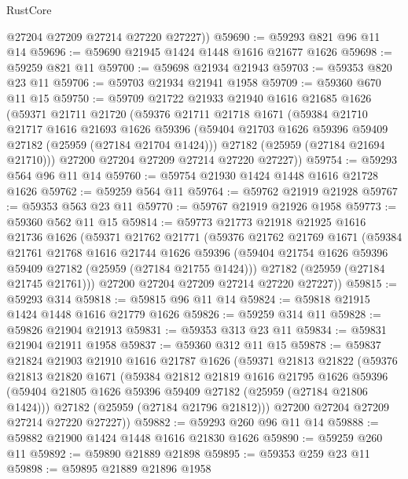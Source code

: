 \begin{lexlean}{RustCore}
\begin{coremodule}
        @27204
        @27209
        @27214
        @27220
        @27227))
@59690 := @59293 @821 @96 @11 @14
@59696 := @59690 @21945 @1424 @1448 @1616 @21677 @1626
@59698 := @59259 @821 @11
@59700 := @59698 @21934 @21943
@59703 := @59353 @820 @23 @11
@59706 := @59703 @21934 @21941 @1958
@59709 := @59360 @670 @11 @15
@59750 := @59709
    @21722
    @21933
    @21940
    @1616
    @21685
    @1626
    (@59371
      @21711
      @21720
      (@59376
        @21711
        @21718
        @1671
        (@59384
          @21710
          @21717
          @1616
          @21693
          @1626
          @59396
          (@59404 @21703 @1626 @59396 @59409 @27182 (@25959 (@27184 @21704 @1424)))
          @27182
          (@25959 (@27184 @21694 @21710)))
        @27200
        @27204
        @27209
        @27214
        @27220
        @27227))
@59754 := @59293 @564 @96 @11 @14
@59760 := @59754 @21930 @1424 @1448 @1616 @21728 @1626
@59762 := @59259 @564 @11
@59764 := @59762 @21919 @21928
@59767 := @59353 @563 @23 @11
@59770 := @59767 @21919 @21926 @1958
@59773 := @59360 @562 @11 @15
@59814 := @59773
    @21773
    @21918
    @21925
    @1616
    @21736
    @1626
    (@59371
      @21762
      @21771
      (@59376
        @21762
        @21769
        @1671
        (@59384
          @21761
          @21768
          @1616
          @21744
          @1626
          @59396
          (@59404 @21754 @1626 @59396 @59409 @27182 (@25959 (@27184 @21755 @1424)))
          @27182
          (@25959 (@27184 @21745 @21761)))
        @27200
        @27204
        @27209
        @27214
        @27220
        @27227))
@59815 := @59293 @314
@59818 := @59815 @96 @11 @14
@59824 := @59818 @21915 @1424 @1448 @1616 @21779 @1626
@59826 := @59259 @314 @11
@59828 := @59826 @21904 @21913
@59831 := @59353 @313 @23 @11
@59834 := @59831 @21904 @21911 @1958
@59837 := @59360 @312 @11 @15
@59878 := @59837
    @21824
    @21903
    @21910
    @1616
    @21787
    @1626
    (@59371
      @21813
      @21822
      (@59376
        @21813
        @21820
        @1671
        (@59384
          @21812
          @21819
          @1616
          @21795
          @1626
          @59396
          (@59404 @21805 @1626 @59396 @59409 @27182 (@25959 (@27184 @21806 @1424)))
          @27182
          (@25959 (@27184 @21796 @21812)))
        @27200
        @27204
        @27209
        @27214
        @27220
        @27227))
@59882 := @59293 @260 @96 @11 @14
@59888 := @59882 @21900 @1424 @1448 @1616 @21830 @1626
@59890 := @59259 @260 @11
@59892 := @59890 @21889 @21898
@59895 := @59353 @259 @23 @11
@59898 := @59895 @21889 @21896 @1958

\end{coremodule}
\end{lexlean}
